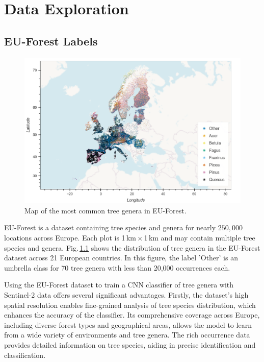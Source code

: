 \chapter{Data Exploration}
\label{chapter:data}
\section{EU-Forest Labels}

\begin{figure}[!thb]
    \centering
    \includegraphics[width=0.9\linewidth]{figures/figures_labels/genus_cutoff_map.png}
    \caption{Map of the most common tree genera in EU-Forest.}
    \label{fig:genus_cutoff_map}
\end{figure}

EU-Forest is a dataset containing tree species and genera for nearly $250,000$ locations across Europe. Each plot is 1\,km\,×\,1\,km and may contain multiple tree species and genera. Fig.\,\ref{fig:genus_cutoff_map} shows the distribution of tree genera in the EU-Forest dataset across 21 European countries. In this figure, the label 'Other' is an umbrella class for 70 tree genera with less than 20,000 occurrences each.

Using the EU-Forest dataset to train a CNN classifier of tree genera with Sentinel-2 data offers several significant advantages. Firstly, the dataset's high spatial resolution enables fine-grained 
analysis of tree species distribution, which enhances the accuracy of the classifier. Its comprehensive coverage across Europe, including diverse forest types and geographical areas, allows the model to learn from a wide variety of environments and tree genera. The rich occurrence data provides detailed information on tree species, aiding in precise identification and classification.

